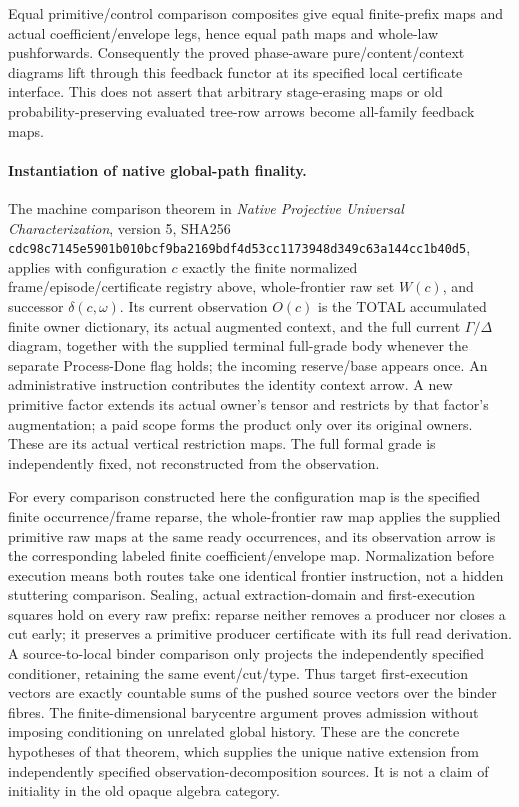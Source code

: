 \documentclass[11pt]{article}
\begin{document}
Equal primitive/control comparison composites give equal finite-prefix maps and actual coefficient/envelope legs, hence equal path maps and whole-law pushforwards. Consequently the proved phase-aware pure/content/context diagrams lift through this feedback functor at its specified local certificate interface. This does not assert that arbitrary stage-erasing maps or old probability-preserving evaluated tree-row arrows become all-family feedback maps.

\paragraph{Instantiation of native global-path finality.}
The machine comparison theorem in \emph{Native Projective Universal Characterization}, version 5, SHA256 \texttt{cdc98c7145e5901b010bcf9ba2169bdf4d53cc1173948d349c63a144cc1b40d5}, applies with configuration $c$ exactly the finite normalized frame/episode/certificate registry above, whole-frontier raw set $W(c)$, and successor $\delta(c,\omega)$. Its current observation $O(c)$ is the TOTAL accumulated finite owner dictionary, its actual augmented context, and the full current $\Gamma/\Delta$ diagram, together with the supplied terminal full-grade body whenever the separate Process-Done flag holds; the incoming reserve/base appears once. An administrative instruction contributes the identity context arrow. A new primitive factor extends its actual owner's tensor and restricts by that factor's augmentation; a paid scope forms the product only over its original owners. These are its actual vertical restriction maps. The full formal grade is independently fixed, not reconstructed from the observation.

For every comparison constructed here the configuration map is the specified finite occurrence/frame reparse, the whole-frontier raw map applies the supplied primitive raw maps at the same ready occurrences, and its observation arrow is the corresponding labeled finite coefficient/envelope map. Normalization before execution means both routes take one identical frontier instruction, not a hidden stuttering comparison. Sealing, actual extraction-domain and first-execution squares hold on every raw prefix: reparse neither removes a producer nor closes a cut early; it preserves a primitive producer certificate with its full read derivation. A source-to-local binder comparison only projects the independently specified conditioner, retaining the same event/cut/type. Thus target first-execution vectors are exactly countable sums of the pushed source vectors over the binder fibres. The finite-dimensional barycentre argument proves admission without imposing conditioning on unrelated global history. These are the concrete hypotheses of that theorem, which supplies the unique native extension from independently specified observation-decomposition sources. It is not a claim of initiality in the old opaque algebra category.
\end{document}
